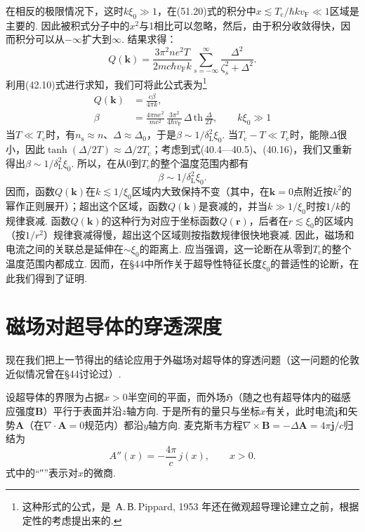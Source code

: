 在相反的极限情况下，这时$k\xi_0\gg1$，在(51.20)式的积分中$x\lesssim T_{\mathrm{c}}/\hbar kv_{\mathrm{F}}\ll1$区域是主要的. 因此被积式分子中的$x^2$与1相比可以忽略，然后，由于积分收敛得快，因而积分可以从$-\infty$扩大到$\infty$. 结果求得：
\begin{equation*}
Q(\bm{k})=\frac{3\pi^2ne^2T}{2mc\hbar v_{\mathrm{F}}k}
\sum_{s=-\infty}^{\infty}\frac{\Delta^2}{\zeta_s^2+\Delta^2}.
\end{equation*}
利用(42.10)式进行求知，我们可将此公式表为\footnote{这种形式的公式，是~А.\,В.\,Pippard, 1953 年还在微观超导理论建立之前，根据定性的考虑提出来的.}
\begin{equation}
\begin{aligned}
Q(\bm{k})&=\frac{c\beta}{4\pi k},\\
\beta&=\frac{4\pi ne^2}{mc^2}\,\frac{3\pi^2}{4\hbar v_{\mathrm{F}}}\,
\Delta\,\mathrm{th}\,\frac{\Delta}{2T},\qquad k\xi_0\gg1
\end{aligned}
\end{equation}
当$T\ll T_{\mathrm{c}}$时，有$n_{\mathrm{s}}\approx n$、$\Delta\approx\Delta_0$，于是$\beta\sim1/\delta_{\mathrm{L}}^2\xi_0$. 当$T_{\mathrm{c}}-T\ll T_{\mathrm{c}}$时，能隙$\Delta$很小，因此$\tanh(\Delta/2T)\approx\Delta/2T_{\mathrm{c}}$；考虑到式(40.4—40.5)、(40.16)，我们又重新得出$\beta\sim1/\delta_{\mathrm{L}}^2\xi_0$. 所以，在从0到$T_{\mathrm{c}}$的整个温度范围内都有
\begin{equation}
\beta\sim1/\delta_{\mathrm{L}}^2\xi_0.
\end{equation}
因而，函数$Q(\bm{k})$在$k\lesssim1/\xi_0$区域内大致保持不变（其中，在$\bm{k}=0$点附近按$k^2$的幂作正则展开）；超出这个区域，函数$Q(\bm{k})$是衰减的，并当$k\gg1/\xi_0$时按$1/k$的规律衰减. 函数$Q(\bm{k})$的这种行为对应于坐标函数$Q(\bm{r})$，后者在$r\lesssim\xi_0$的区域内（按$1/r^2$）规律衰减得慢，超出这个区域则按指数规律很快地衰减. 因此，磁场和电流之间的关联总是延伸在$\sim\xi_0$的距离上. 应当强调，这一论断在从零到$T_{\mathrm{c}}$的整个温度范围内都成立. 因而，在§44中所作关于超导性特征长度$\xi_0$的普适性的论断，在此我们得到了证明.

\section{磁场对超导体的穿透深度}

现在我们把上一节得出的结论应用于外磁场对超导体的穿透问题（这一问题的伦敦近似情况曾在§44讨论过）.

设超导体的界限为占据$x>0$半空间的平面，而外场$\mathfrak{H}$（随之也有超导体内的磁感应强度$\bm{B}$）平行于表面并沿$z$轴方向. 于是所有的量只与坐标$x$有关，此时电流$\bm{j}$和矢势$\bm{A}$（在$\nabla\cdot\bm{A}=0$规范内）都沿$y$轴方向. 麦克斯韦方程$\nabla\times\bm{B}=-\Delta\bm{A}=4\pi\bm{j}/c$归结为
\begin{equation}
A''(x)=-\frac{4\pi}{c}\,j(x),\qquad x>0.
\end{equation}
式中的“″”表示对$x$的微商.

